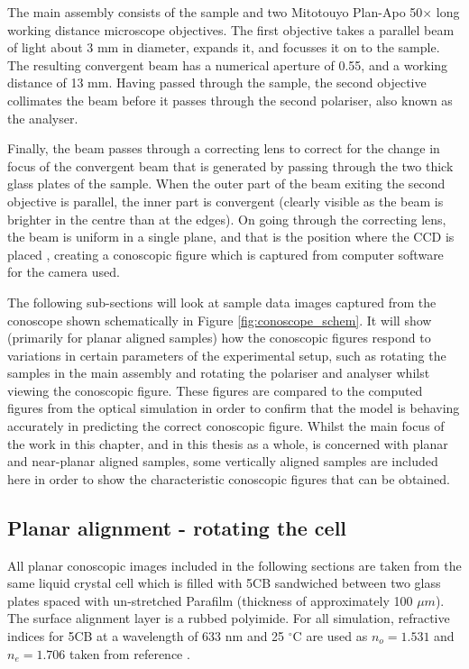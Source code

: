 The main assembly consists of the sample and two Mitotouyo Plan-Apo 50$\times$ long working distance microscope objectives. The first objective takes a parallel beam of light about 3 mm in diameter, expands it, and focusses it on to the sample. The resulting convergent beam has a numerical aperture of 0.55, and a working distance of 13 mm. Having passed through the sample, the second objective collimates the beam before it passes through the second polariser, also known as the analyser.

Finally, the beam passes through a correcting lens to correct for the change in focus of the convergent beam that is generated by passing through the two thick glass plates of the sample. When the outer part of the beam exiting the second objective is parallel, the inner part is convergent (clearly visible as the beam is brighter in the centre than at the edges). On going through the correcting lens, the beam is uniform in a single plane, and that is the position where the CCD is placed \cite{Cornford2008}, creating a conoscopic figure which is captured from computer software for the camera used.

The following sub-sections will look at sample data images captured from the conoscope shown schematically in Figure \ref{fig:conoscope_schem}. It will show (primarily for planar aligned samples) how the conoscopic figures respond to variations in certain parameters of the experimental setup, such as rotating the samples in the main assembly and rotating the polariser and analyser whilst viewing the conoscopic figure. These figures are compared to the computed figures from the optical simulation in order to confirm that the model is behaving accurately in predicting the correct conoscopic figure. Whilst the main focus of the work in this chapter, and in this thesis as a whole, is concerned with planar and near-planar aligned samples, some vertically aligned samples are included here in order to show the characteristic conoscopic figures that can be obtained.

\subsection{Planar alignment - rotating the cell}
All planar conoscopic images included in the following sections are taken from the same liquid crystal cell which is filled with 5CB sandwiched between two glass plates spaced with un-stretched Parafilm (thickness of approximately 100 $\mu m$). The surface alignment layer is a rubbed polyimide. For all simulation, refractive indices for 5CB at a wavelength of 633 nm and 25 $^{\circ}$C are used as $n_o=1.531$ and $n_e=1.706$ taken from reference \cite{Li2005}.

